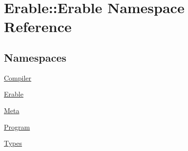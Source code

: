 \hypertarget{namespace_erable_1_1_erable}{}\section{Erable\+::Erable Namespace Reference}
\label{namespace_erable_1_1_erable}
\subsection*{Namespaces}
\begin{DoxyCompactItemize}
\item 
 \mbox{\hyperlink{namespace_erable_1_1_erable_1_1_compiler}{Compiler}}
\item 
 \mbox{\hyperlink{namespace_erable_1_1_erable_1_1_erable}{Erable}}
\item 
 \mbox{\hyperlink{namespace_erable_1_1_erable_1_1_meta}{Meta}}
\item 
 \mbox{\hyperlink{namespace_erable_1_1_erable_1_1_program}{Program}}
\item 
 \mbox{\hyperlink{namespace_erable_1_1_erable_1_1_types}{Types}}
\end{DoxyCompactItemize}
